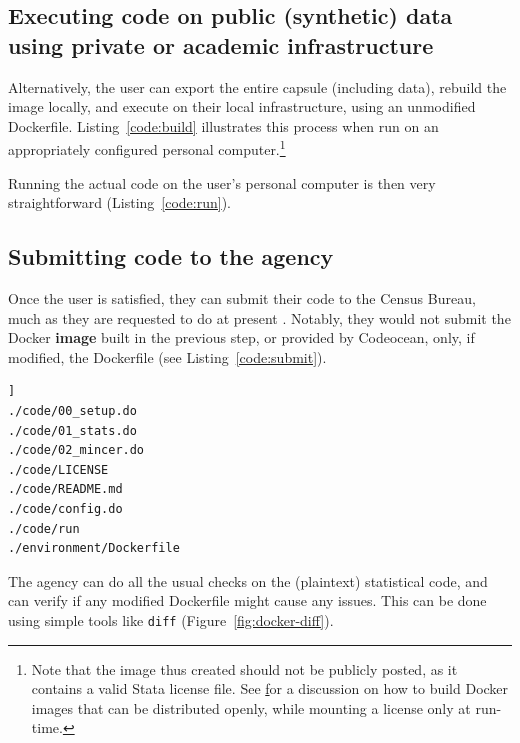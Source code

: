 \documentclass[]{hdsr}
\begin{document}
\subsection{Executing code on public (synthetic) data using private or academic infrastructure}

Alternatively, the user can export the entire capsule (including data), rebuild the image locally, and execute on their local infrastructure, using an unmodified Dockerfile. Listing~\ref{code:build} illustrates this process when run on an appropriately configured personal computer.\footnote{Note that the image thus created should not be publicly posted, as it contains a valid Stata license file. See \href{https://github.com/AEADataEditor/docker-stata} for a discussion on how to build Docker images that can be distributed openly, while mounting a license only at run-time.}


%

\noindent Running the actual code on the user's personal computer is then very straightforward (Listing~\ref{code:run}).






\subsection{Submitting code to the agency}

Once the user is satisfied, they can submit their code to the Census Bureau, much as they are requested to do at present \citep{u.s.censusbureauSIPPSyntheticBeta2015b}. Notably, they would not submit the Docker \textbf{image} built in the previous step, or provided by Codeocean, only, if modified, the Dockerfile (see Listing~\ref{code:submit}).

\begin{lstlisting}[language=bash, caption=Submitted files,basicstyle=\footnotesize\color{NavyBlue}\ttfamily,label={code:submit}]]
./code/00_setup.do
./code/01_stats.do
./code/02_mincer.do
./code/LICENSE
./code/README.md
./code/config.do
./code/run
./environment/Dockerfile
\end{lstlisting}


The agency can do all the usual checks on the (plaintext) statistical code, and can verify if any modified Dockerfile might cause any issues. This can be done using simple tools like \texttt{diff} (Figure~\ref{fig:docker-diff}).
\end{document}
